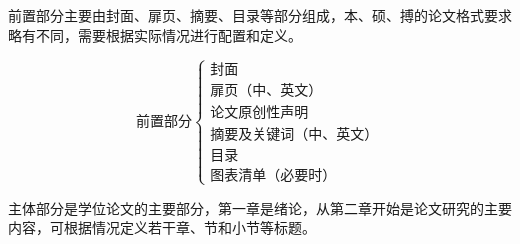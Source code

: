 前置部分主要由封面、扉页、摘要、目录等部分组成，本、硕、搏的论文格式要求略有不同，需要根据实际情况进行配置和定义。

\[
    \text{前置部分}
    \begin{cases}
        \text{封面}                     \\
        \text{扉页（中、英文）}         \\
        \text{论文原创性声明}           \\
        \text{摘要及关键词（中、英文）} \\
        \text{目录}                     \\
        \text{图表清单（必要时）}
    \end{cases}
\]

主体部分是学位论文的主要部分，第一章是绪论，从第二章开始是论文研究的主要内容，可根据情况定义若干章、节和小节等标题。

